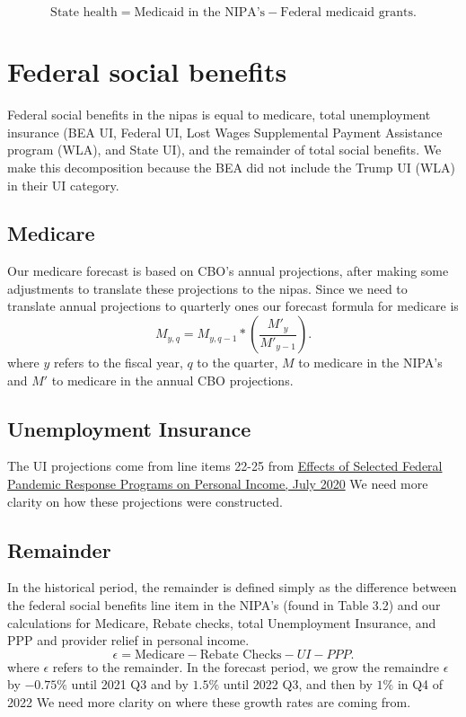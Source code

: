 \documentclass[a4paper]{article}
\begin{document}
\[
\text{State health} = \text{Medicaid in the NIPA's} - \text{Federal medicaid grants}
.\] 
\section{Federal social benefits}
Federal social benefits in the nipas is equal to medicare, total unemployment insurance (BEA UI,
Federal UI, Lost Wages Supplemental Payment Assistance program (WLA), and State UI), and the remainder of total social benefits. We make this
decomposition because the BEA did not include the Trump UI (WLA) in their UI category.  
\subsection{Medicare}
Our medicare forecast is based on CBO's annual projections, after making some adjustments to
translate these projections to the nipas. Since we need to translate annual projections to quarterly
ones our forecast formula for medicare is
\[
  M_{y, q} = M_{y, q-1}*(\frac{M'_{y}}{M'_{y-1}})
.\] 
where $y$ refers to the fiscal year, $q$ to the quarter, $M$ to medicare in the NIPA's and $M'$ to
medicare in the annual CBO projections.

\subsection{Unemployment Insurance}
The UI projections come from line items 22-25 from
\href{https://www.google.com/url?sa=t&rct=j&q=&esrc=s&source=web&cd=&cad=rja&uact=8&ved=2ahUKEwiKrurfj5zuAhWsGVkFHak3C7MQFjAEegQIAhAC&url=https%3A%2F%2Fwww.bea.gov%2Fsystem%2Ffiles%2F2020-07%2Feffects-of-selected-federal-pandemic-response-programs-on-personal-income-2020q2-advance.pdf&usg=AOvVaw0M-6ew-4iD7r1mb5f7WIFx}{Effects
of Selected Federal Pandemic Response Programs on Personal Income, July 2020}
\remark
We need more clarity on how these projections were constructed.
\subsection{Remainder}
In the historical period, the remainder is defined simply as the difference between the federal social benefits line item in
the NIPA's (found in Table 3.2) and our calculations for Medicare, Rebate checks, total Unemployment
Insurance, and PPP and provider relief in personal income.
\[
\epsilon=\text{Medicare} - \text{Rebate Checks} - UI - PPP
.\]
where $\epsilon$ refers to the remainder.
In the forecast period, we grow the remaindre $\epsilon$ by $-0.75 \%$ until  2021 Q3 and by $1.5\%$
until 2022 Q3, and then by  $1\%$ in Q4 of 2022
\remark
We need more clarity on where these growth rates are coming from. 
\end{document}
